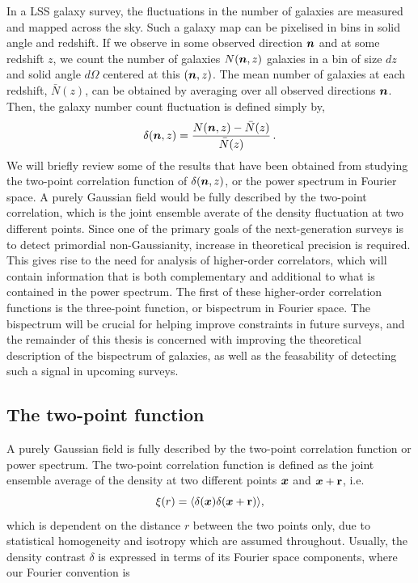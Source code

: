 In a LSS galaxy survey, the fluctuations in the number of galaxies are measured and mapped across the sky. Such a galaxy map can be pixelised in bins in solid angle and redshift. If we observe in some observed direction $\bm {n}$ and at some redshift $z$, we count the number of galaxies $N(\bm {n},z)$ galaxies in a bin of size $dz$ and solid angle $d\Omega$ centered at this $(\bm {n},z)$. The mean number of galaxies at each redshift, $\bar{N}(z)$, can be obtained by averaging over all observed directions $\bm {n}$. Then, the galaxy number count fluctuation is defined simply by, 
\begin{equation}
	\delta(\bm {n},z) = \frac{N(\bm {n},z) - \bar{N}(z)}{\bar{N}(z)}\,.
\end{equation}
We will briefly review some of the results that have been obtained from studying the two-point correlation function of $\delta(\bm {n},z)$, or the power spectrum in Fourier space. A purely Gaussian field would be fully described by the two-point correlation, which is the joint ensemble averate of the density fluctuation at two different points. Since one of the primary goals of the next-generation surveys is to detect primordial non-Gaussianity, increase in theoretical precision is required. This gives rise to the need for analysis of higher-order correlators, which will contain information that is both complementary and additional to what is contained in the power spectrum. The first of these higher-order correlation functions is the three-point function, or bispectrum in Fourier space. The bispectrum will be crucial for helping improve constraints in future surveys, and the remainder of this thesis is concerned with improving the theoretical description of the bispectrum of galaxies, as well as the feasability of detecting such a signal in upcoming surveys.

\subsection{The two-point function}

A purely Gaussian field is fully described by the two-point correlation function or power spectrum. The two-point correlation function is defined as the joint ensemble average of the density at two different points $\bm {x}$ and $\bm {x} + \textbf{r}$, i.e. 
\begin{equation}
	\xi(r) = \langle \delta(\bm {x}) \delta(\bm {x} + \textbf{r}) \rangle,
\end{equation}
which is dependent on the distance $r$ between the two points only, due to statistical homogeneity and isotropy which are assumed throughout. Usually, the density contrast $\delta$ is expressed in terms of its Fourier space components, where our Fourier convention is 

